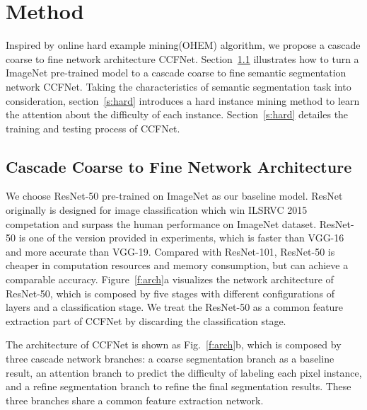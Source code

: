 \documentclass[10.5pt,compsoc]{TsT}
\theoremstyle{mystyle}
\begin{document}
{\section{Method}
\label{s:Method}
\noindent


Inspired by online hard example mining(OHEM) algorithm, we propose a cascade coarse to fine network architecture CCFNet. 
Section~\ref{s:arch} illustrates how to turn a ImageNet pre-trained model to a cascade coarse to fine semantic segmentation network CCFNet.
Taking the characteristics of semantic segmentation task into consideration, section~\ref{s:hard} introduces a hard instance mining method to learn the attention about the difficulty of each instance.
Section~\ref{s:hard} detailes the training and testing process of CCFNet. 

\subsection{Cascade Coarse to Fine Network Architecture}
\label{s:arch}
\noindent

We choose ResNet-50 pre-trained on ImageNet as our baseline model.
ResNet originally is designed for image classification which win ILSRVC 2015 competation and surpass the human performance on ImageNet dataset.
ResNet-50 is one of the version provided in experiments, which is faster than VGG-16 and more accurate than VGG-19.
Compared with ResNet-101, ResNet-50 is cheaper in computation resources and memory consumption, but can achieve a comparable accuracy.
Figure~\ref{f:arch}a  visualizes the network architecture of ResNet-50, which is composed by five stages with different configurations of layers and a classification stage.
We treat the ResNet-50 as a common feature extraction part of CCFNet by discarding the classification stage.


The architecture of CCFNet is shown as Fig.~\ref{f:arch}b, which is composed by three cascade network branches: a coarse segmentation branch as a baseline result, an attention branch to predict the difficulty of labeling each pixel instance, and a refine segmentation branch to refine the final segmentation results. 
These three branches share a common feature extraction network.

}
\end{document}
